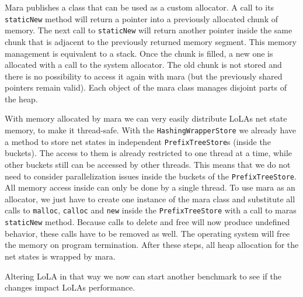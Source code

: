 Mara publishes a class that can be used as a custom allocator. A call to its \texttt{staticNew} method will return a pointer into a previously allocated chunk of memory. The next call to \texttt{staticNew} will return another pointer inside the same chunk that is adjacent to the previously returned memory segment. This memory management is equivalent to a stack. Once the chunk is filled, a new one is allocated with a call to the system allocator. The old chunk is not stored and there is no possibility to access it again with mara (but the previously shared pointers remain valid). Each object of the mara class manages disjoint parts of the heap.

With memory allocated by mara we can very easily distribute LoLAs net state memory, to make it thread-safe. With the \texttt{Hashing\-Wrapper\-Store} we already have a method to store net states in independent \texttt{PrefixTreeStore}s (inside the buckets). The access to them is already restricted to one thread at a time, while other buckets still can be accessed by other threads. This means that we do not need to consider parallelization issues inside the buckets of the \texttt{PrefixTreeStore}. All memory access inside can only be done by a single thread. To use mara as an allocator, we just have to create one instance of the mara class and substitute all calls to \texttt{malloc}, \texttt{calloc} and \texttt{new} inside the \texttt{PrefixTreeStore} with a call to maras \texttt{staticNew} method. Because calls to delete and free will now produce undefined behavior, these calls have to be removed as well. The operating system will free the memory on program termination. After these steps, all heap allocation for the net states is wrapped by mara. 

Altering LoLA in that way we now can start another benchmark to see if the changes impact LoLAs performance. 

